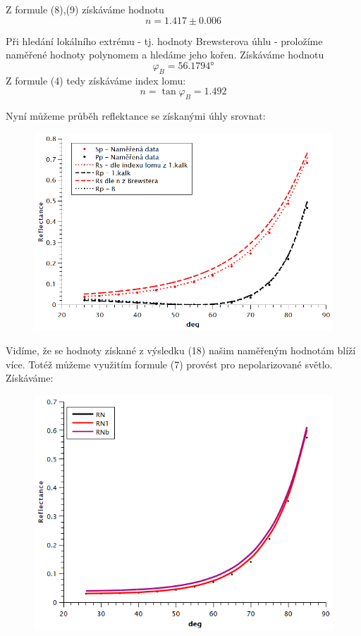 \documentclass[czech,11pt,a4paper]{article}
\begin{document}
\begin{multicols}{2}
		Z formule (8),(9) získáváme hodnotu
		\begin{equation}
			n = 1.417 \pm 0.006
		\end{equation}
		
		
		Při hledání lokálního extrému - tj. hodnoty Brewsterova úhlu - proložíme naměřené hodnoty polynomem a hledáme jeho kořen. Získáváme hodnotu
		\begin{equation}
			\varphi_{B} = 56.1794 °
		\end{equation}
		Z formule (4) tedy získáváme index lomu:
		\begin{equation}
			n = \tan \varphi_B = 1.492
		\end{equation}
		
		Nyní můžeme průběh reflektance se získanými úhly srovnat:
		\begin{figure}[H]
			\includegraphics[width = 0.9\linewidth, center]{Srovnani}
		\end{figure}
		Vidíme, že se hodnoty získané z výsledku (18) našim naměřeným hodnotám blíží více.
		Totéž můžeme využitím formule (7) provést pro nepolarizované světlo. Získáváme:
		\begin{figure}[H]
			\includegraphics[width = 0.9\linewidth, center]{Rn}
		\end{figure}

\end{multicols}
\end{document}
